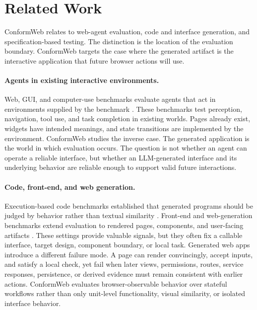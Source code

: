 \section{Related Work}
\label{sec:related}

ConformWeb relates to web-agent evaluation, code and interface generation, and
specification-based testing. The distinction is the location of the evaluation
boundary. ConformWeb targets the case where the generated artifact is the
interactive application that future browser actions will use.

\paragraph{Agents in existing interactive environments.}
Web, GUI, and computer-use benchmarks evaluate agents that act in environments
supplied by the benchmark
\citep{zhou2024webarena,koh2024visualwebarena,drouin2024workarena,xie2024osworld}.
These benchmarks test perception, navigation, tool use, and task completion in
existing worlds. Pages already exist, widgets have intended meanings, and state
transitions are implemented by the environment. ConformWeb studies the inverse
case. The generated application is the world in which evaluation occurs. The
question is not whether an agent can operate a reliable interface, but whether
an LLM-generated interface and its underlying behavior are reliable enough to
support valid future interactions.

\paragraph{Code, front-end, and web generation.}
Execution-based code benchmarks established that generated programs should be
judged by behavior rather than textual similarity
\citep{jimenez2024swebench,jain2024livecodebench,zhuo2024bigcodebench}.
Front-end and web-generation benchmarks extend evaluation to rendered pages,
components, and user-facing artifacts
\citep{si2024design2code,lu2025webgenbench,zhu2025frontendbench,11334714}.
These settings provide valuable signals, but they often fix a callable
interface, target design, component boundary, or local task. Generated web apps
introduce a different failure mode. A page can render convincingly, accept
inputs, and satisfy a local check, yet fail when later views, permissions,
routes, service responses, persistence, or derived evidence must remain
consistent with earlier actions. ConformWeb evaluates browser-observable
behavior over stateful workflows rather than only unit-level functionality,
visual similarity, or isolated interface behavior.

